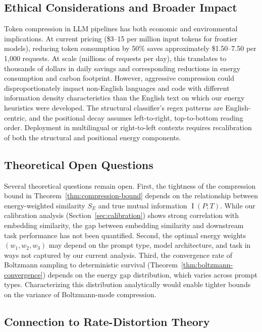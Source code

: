 \documentclass[11pt]{article}
\theoremstyle{remark}
\DeclareMathOperator{\MI}{I}
\begin{document}
\subsection{Ethical Considerations and Broader Impact}

Token compression in LLM pipelines has both economic and environmental
implications. At current pricing (\$3--15 per million input tokens for
frontier models), reducing token consumption by 50\% saves approximately
\$1.50--7.50 per 1,000 requests. At scale (millions of requests per day),
this translates to thousands of dollars in daily savings and corresponding
reductions in energy consumption and carbon footprint. However, aggressive
compression could disproportionately impact non-English languages and
code with different information density characteristics than the English
text on which our energy heuristics were developed. The structural
classifier's regex patterns are English-centric, and the positional
decay assumes left-to-right, top-to-bottom reading order. Deployment in
multilingual or right-to-left contexts requires recalibration of both
the structural and positional energy components.

\subsection{Theoretical Open Questions}

Several theoretical questions remain open. First, the tightness of the
compression bound in Theorem~\ref{thm:compression-bound} depends on the
relationship between energy-weighted similarity $S_E$ and true mutual
information $\MI(P; T)$. While our calibration analysis
(Section~\ref{sec:calibration}) shows strong correlation with embedding
similarity, the gap between embedding similarity and downstream task
performance has not been quantified. Second, the optimal energy weights
$(w_1, w_2, w_3)$ may depend on the prompt type, model architecture,
and task in ways not captured by our current analysis. Third, the
convergence rate of Boltzmann sampling to deterministic survival
(Theorem~\ref{thm:boltzmann-convergence}) depends on the energy gap
distribution, which varies across prompt types. Characterizing this
distribution analytically would enable tighter bounds on the variance
of Boltzmann-mode compression.

\subsection{Connection to Rate-Distortion Theory}
\end{document}
